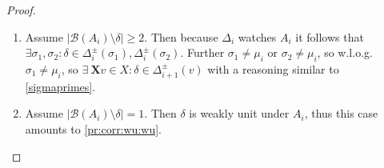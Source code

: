 \documentclass{vutinfth} %
\newcommand{\bass}{\mathcal{B}}
\newcommand{\bX}{\mathbf{X}}
\newcommand{\sgl}{\mu}
\newcommand{\bsgl}{\sigma}
\begin{document}
\begin{proof}
\begin{enumerate}
\begin{enumerate}
\begin{enumerate}
\item Assume $|\bass(A_i) \setminus \delta| \geq 2$. Then because $\Delta_i$ watches $A_i$ it follows that $\exists \bsgl_1, \bsgl_2 : \delta \in \Delta_i^\pm(\bsgl_1), \Delta_i^\pm(\bsgl_2)$. Further $\bsgl_1 \not = \sgl_i$ or $\bsgl_2 \not = \sgl_i$, so w.l.o.g.~$\bsgl_1 \not = \sgl_i$, so $\exists \ {\bX v} \in X : \delta \in \Delta_{i+1}^\pm(v)$ with a reasoning similar to \ref{sigmaprimes}.

\item Assume $|\bass(A_i) \setminus \delta| = 1$. Then $\delta$ is weakly unit under $A_i$, thus this case amounts to \ref{pr:corr:wu:wu}.
\end{enumerate}

\end{enumerate}

\end{enumerate}


\end{proof}
\end{document}
